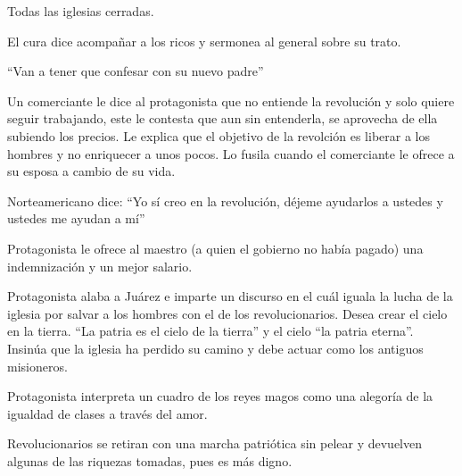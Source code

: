 \begin{compactitem}
    \item Todas las iglesias cerradas.\autocite[8:50]{fernandez_enamorada_1946}
    \item El cura dice acompañar a los ricos y sermonea al general sobre su trato.\autocite[9:30]{fernandez_enamorada_1946}
    \item ``Van a tener que confesar con su nuevo padre''\autocite[9:56]{fernandez_enamorada_1946}
    \item Un comerciante le dice al protagonista que no entiende la revolución y solo quiere seguir trabajando, este le contesta que aun sin entenderla, se aprovecha de ella subiendo los precios. Le explica que el objetivo de la revolción es liberar a los hombres y no enriquecer a unos pocos. Lo fusila cuando el comerciante le ofrece a su esposa a cambio de su vida.\autocite[13:01-15:00]{fernandez_enamorada_1946}
    \item Norteamericano dice: ``Yo sí creo en la revolución, déjeme ayudarlos a ustedes y ustedes me ayudan a mí''\autocite[28:46]{fernandez_enamorada_1946}
    \item Protagonista le ofrece al maestro (a quien el gobierno no había pagado) una indemnización y un mejor salario.\autocite[18:30]{fernandez_enamorada_1946}
    \item Protagonista alaba a Juárez e imparte un discurso en el cuál iguala la lucha de la iglesia por salvar a los hombres con el de los revolucionarios. Desea crear el cielo en la tierra. ``La patria es el cielo de la tierra'' y el cielo ``la patria eterna''. Insinúa que la iglesia ha perdido su camino y debe actuar como los antiguos misioneros.\autocite[22:31-25:17]{fernandez_enamorada_1946}
    \item Protagonista interpreta un cuadro de los reyes magos como una alegoría de la igualdad de clases a través del amor.\autocite[1:07:19]{fernandez_enamorada_1946}  
    \item Revolucionarios se retiran con una marcha patriótica sin pelear y devuelven algunas de las riquezas tomadas, pues es más digno.\autocite[1:27:21-1:35:20]{fernandez_enamorada_1946}  
    \end{compactitem} 

